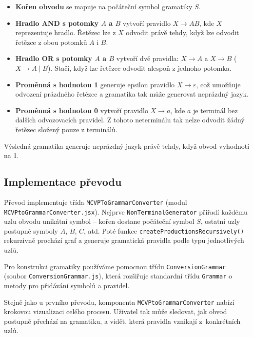 \begin{itemize}
    \item \textbf{Kořen obvodu} se mapuje na počáteční symbol gramatiky $S$.
    
    \item \textbf{Hradlo AND s potomky $A$ a $B$} vytvoří pravidlo $X \to AB$, kde $X$ reprezentuje hradlo. Řetězec lze z $X$ odvodit právě tehdy, když lze odvodit řetězce z obou potomků $A$ i $B$.
    
    \item \textbf{Hradlo OR s potomky $A$ a $B$} vytvoří dvě pravidla: $X \to A$ a $X \to B$ ($X \to A \mid B$). Stačí, když lze řetězec odvodit alespoň z jednoho potomka.
    
    \item \textbf{Proměnná s hodnotou 1} generuje epsilon pravidlo $X \to \varepsilon$, což umožňuje odvození prázdného řetězce a gramatika tak může generovat neprázdný jazyk.
    
    \item \textbf{Proměnná s hodnotou 0} vytvoří pravidlo $X \to a$, kde $a$ je terminál bez dalších odvozovacích pravidel. Z tohoto neterminálu tak nelze odvodit žádný řetězec složený pouze z terminálů.
\end{itemize}

Výsledná gramatika generuje neprázdný jazyk právě tehdy, když obvod vyhodnotí na 1.

\subsection{Implementace převodu}
\label{sec:MCVPtoGrammarImplementation}

Převod implementuje třída \texttt{MCVPToGrammarConverter} (modul \texttt{MCVPtoGrammarConverter.jsx}). Nejprve \texttt{NonTerminalGenerator} přiřadí každému uzlu obvodu unikátní symbol – kořen dostane počáteční symbol $S$, ostatní uzly postupně symboly $A$, $B$, $C$, atd. Poté funkce \texttt{createProductionsRecursively()} rekurzivně prochází graf a generuje gramatická pravidla podle typu jednotlivých uzlů.

Pro konstrukci gramatiky používáme pomocnou třídu \texttt{ConversionGrammar} (soubor \texttt{ConversionGrammar.js}), která rozšiřuje standardní třídu \texttt{Grammar} o metody pro přidávání symbolů a pravidel.

Stejně jako u prvního převodu, komponenta \texttt{MCVPtoGrammarConverter} nabízí krokovou vizualizaci celého procesu. Uživatel tak může sledovat, jak obvod postupně přechází na gramatiku, a vidět, která pravidla vznikají z~konkrétních uzlů.

